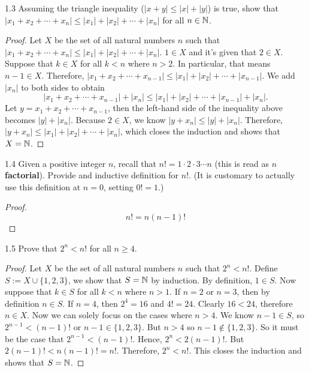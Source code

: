 \begin{exercise}{1.3}
    Assuming the triangle inequality (\(|x+y| \leq |x| + |y|\)) is true,
    show that \(|x_1 + x_2 + \cdots + x_n| \leq |x_1| + |x_2| + \cdots + |x_n|\) for all \(n \in \mathbb{N}\).
\end{exercise}
\begin{proof}
    Let \(X\) be the set of all natural numbers \(n\) such that \(|x_1 + x_2 + \cdots + x_n| \leq |x_1| + |x_2| + \cdots + |x_n|\).
    \(1 \in X\) and it's given that \(2 \in X\). Suppose that \(k \in X\) for all \(k < n\) where \(n > 2\). In particular, that means \(n-1 \in X\).
    Therefore, \(|x_1 + x_2 + \cdots + x_{n-1}| \leq |x_1| + |x_2| + \cdots + |x_{n-1}|\). We add \(|x_n|\) to both sides to obtain
    \[|x_1 + x_2 + \cdots + x_{n-1}| + |x_n| \leq |x_1| + |x_2| + \cdots + |x_{n-1}| + |x_n|.\]
    Let \(y = x_1 + x_2 + \cdots + x_{n-1}\), then the left-hand side of the inequality above becomes \(|y| + |x_n|\).
    Because \(2 \in X\), we know \(|y + x_n| \leq |y| + |x_n|\). Therefore, \(|y + x_n| \leq |x_1| + |x_2| + \cdots + |x_n|\), which
    closes the induction and shows that \(X = \mathbb{N}\).
\end{proof}

\begin{exercise}{1.4}
    Given a positive integer \(n\), recall that \(n! = 1 \cdot 2 \cdot 3 \cdots n\) (this is read as \(n\) \textbf{factorial}).
    Provide and inductive definition for \(n!\). (It is customary to actually use this definition at \(n = 0\), setting \(0! = 1\).)
\end{exercise}
\begin{proof}
    \[n! = n(n-1)!\]
\end{proof}

\newpage
\begin{exercise}{1.5}
    Prove that \(2^n < n!\) for all \(n \geq 4\).
\end{exercise}
\begin{proof}
    Let \(X\) be the set of all natural numbers \(n\) such that \(2^n < n!\).
    Define \(S := X \cup \{1, 2, 3\}\), we show that \(S = \mathbb{N}\) by induction. By definition, \(1 \in S\).
    Now suppose that \(k \in S\) for all \(k < n\) where \(n > 1\). If \(n = 2\) or \(n = 3\), then by definition \(n \in S\).
    If \(n = 4\), then \(2^4 = 16\) and \(4! = 24\). Clearly \(16 < 24\), therefore \(n \in X\). Now we can solely focus on the
    cases where \(n > 4\). We know \(n-1 \in S\), so \(2^{n-1} < (n-1)!\) or \(n-1 \in \{1,2,3\}\). But
    \(n > 4\) so \(n-1 \notin \{1,2,3\}\). So it must be the case that \(2^{n-1} < (n-1)!\).
    Hence, \(2^n < 2(n-1)!\). But \(2(n-1)! < n(n-1)! = n!\). Therefore, \(2^n < n!\). This closes the induction and shows that \(S = \mathbb{N}\).
\end{proof}

